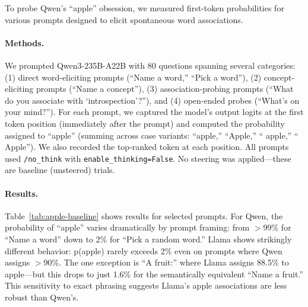 \documentclass{article}
\begin{document}
To probe Qwen's ``apple'' obsession, we measured first-token probabilities for various prompts designed to elicit spontaneous word associations.

\paragraph{Methods.} We prompted Qwen3-235B-A22B with 80 questions spanning several categories: (1) direct word-eliciting prompts (``Name a word,'' ``Pick a word''), (2) concept-eliciting prompts (``Name a concept''), (3) association-probing prompts (``What do you associate with `introspection'?''), and (4) open-ended probes (``What's on your mind?''). For each prompt, we captured the model's output logits at the first token position (immediately after the prompt) and computed the probability assigned to ``apple'' (summing across case variants: ``apple,'' ``Apple,'' `` apple,'' `` Apple''). We also recorded the top-ranked token at each position. All prompts used \texttt{/no\_think} with \texttt{enable\_thinking=False}. No steering was applied---these are baseline (unsteered) trials.

\paragraph{Results.} Table~\ref{tab:apple-baseline} shows results for selected prompts. For Qwen, the probability of ``apple'' varies dramatically by prompt framing: from $>$99\% for ``Name a word'' down to 2\% for ``Pick a random word.'' Llama shows strikingly different behavior: p(apple) rarely exceeds 2\% even on prompts where Qwen assigns $>$90\%. The one exception is ``A fruit:'' where Llama assigns 88.5\% to apple---but this drops to just 1.6\% for the semantically equivalent ``Name a fruit.'' This sensitivity to exact phrasing suggests Llama's apple associations are less robust than Qwen's.
\end{document}
